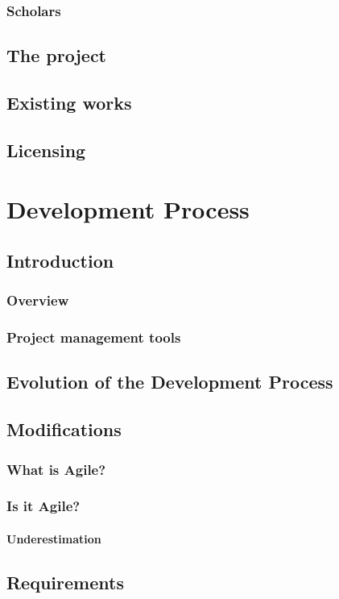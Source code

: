 \subsection{Scholars}
\section{The project}
\section{Existing works}
\section{Licensing}



\chapter{Development Process}
\section{Introduction}
\subsection{Overview}
\subsection{Project management tools}
\section{Evolution of the Development Process}
\section{Modifications}
\subsection{What is Agile?}
\subsection{Is it Agile?}
\subsubsection{Underestimation}
\section{Requirements}
